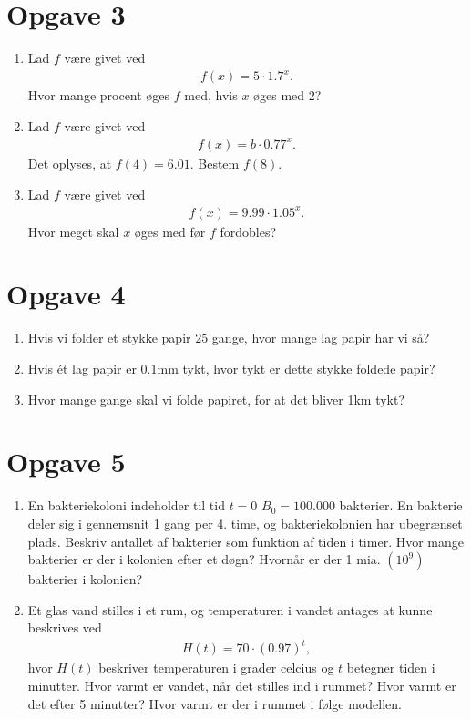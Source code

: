\section*{Opgave 3}

\begin{enumerate}[label=\roman*)]
	\item Lad $f$ være givet ved
	\begin{align*}
		f(x) = 5\cdot 1.7^x.
	\end{align*}
	Hvor mange procent øges $f$ med, hvis $x$ øges med 2?
	\item Lad $f$ være givet ved
	\begin{align*}
		f(x) = b\cdot 0.77^x.
	\end{align*}
	Det oplyses, at $f(4) = 6.01$. Bestem $f(8)$. 
	\item Lad $f$ være givet ved
	\begin{align*}
		f(x) = 9.99 \cdot 1.05^x.
	\end{align*}
	Hvor meget skal $x$ øges med før $f$ fordobles?
\end{enumerate}


\section*{Opgave 4}
\begin{enumerate}[label=\roman*)]
	\item Hvis vi folder et stykke papir $25$ gange, hvor mange lag papir har vi så?
 	\item Hvis ét lag papir er 0.1mm tykt, hvor tykt er dette stykke foldede papir?
	\item Hvor mange gange skal vi folde papiret, for at det bliver 1km tykt?
\end{enumerate}
\section*{Opgave 5}
\begin{enumerate}[label=\roman*)]
\item En bakteriekoloni indeholder til tid $t=0$ $B_0 = 100.000$ bakterier. En bakterie deler sig i gennemsnit 1 gang per 4. time, og bakteriekolonien har ubegrænset plads. Beskriv antallet af bakterier som funktion af tiden i timer. Hvor mange bakterier er der i kolonien efter et døgn? Hvornår er der 1 mia. $(10^9)$ bakterier i kolonien?
\item Et glas vand stilles i et rum, og temperaturen i vandet antages at kunne beskrives ved
\begin{align*}
H(t) = 70\cdot(0.97)^t,
\end{align*}
hvor $H(t)$ beskriver temperaturen i grader celcius og $t$ betegner tiden i minutter. Hvor varmt er vandet, når det stilles ind i rummet? Hvor varmt er det efter 5 minutter? Hvor varmt er der i rummet i følge modellen. 
\end{enumerate}

